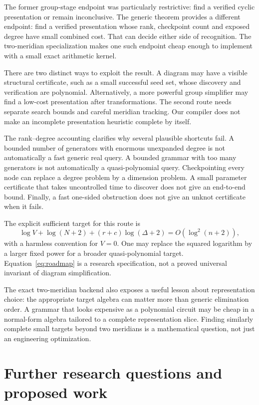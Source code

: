 \documentclass[11pt]{article}
\theoremstyle{definition}
\theoremstyle{remark}
\begin{document}
The former group-stage endpoint was particularly restrictive: find a verified cyclic presentation or remain inconclusive. The generic theorem provides a different endpoint: find a verified presentation whose rank, checkpoint count and exposed degree have small combined cost. That can decide either side of recognition. The two-meridian specialization makes one such endpoint cheap enough to implement with a small exact arithmetic kernel.

There are two distinct ways to exploit the result. A diagram may have a visible structural certificate, such as a small successful seed set, whose discovery and verification are polynomial. Alternatively, a more powerful group simplifier may find a low-cost presentation after transformations. The second route needs separate search bounds and careful meridian tracking. Our compiler does not make an incomplete presentation heuristic complete by itself.

The rank--degree accounting clarifies why several plausible shortcuts fail. A bounded number of generators with enormous unexpanded degree is not automatically a fast generic real query. A bounded grammar with too many generators is not automatically a quasi-polynomial query. Checkpointing every node can replace a degree problem by a dimension problem. A small parameter certificate that takes uncontrolled time to discover does not give an end-to-end bound. Finally, a fast one-sided obstruction does not give an unknot certificate when it fails.

The explicit sufficient target for this route is
\begin{equation}
\log V+\log(N+2)+(r+c)\log(\Delta+2)=O(\log^2(n+2)),
\label{eq:roadmap}
\end{equation}
with a harmless convention for $V=0$. One may replace the squared logarithm by a larger fixed power for a broader quasi-polynomial target. Equation~\eqref{eq:roadmap} is a research specification, not a proved universal invariant of diagram simplification.

The exact two-meridian backend also exposes a useful lesson about representation choice: the appropriate target algebra can matter more than generic elimination order. A grammar that looks expensive as a polynomial circuit may be cheap in a normal-form algebra tailored to a complete representation slice. Finding similarly complete small targets beyond two meridians is a mathematical question, not just an engineering optimization.

\section{Further research questions and proposed work}
\label{sec:future}
\end{document}
